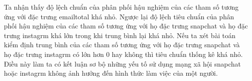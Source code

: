Ta nhận thấy độ lệch chuẩn của phân phối hậu nghiệm của các tham số tương ứng với đặc trưng emailtotal khá nhỏ.
Ngược lại độ lệch tiêu chuẩn của phân phối hậu nghiệm của các tham số tương ứng với họ đặc trưng snapchat và họ đặc trưng instagrm khá lớn trong khi trung bình lại khá nhỏ.
Nếu ta xét bài toán kiểm định trung bình của các tham số tương ứng với họ đặc trưng snapchat và họ đặc trưng instagrm có lớn hơn 0 hay không thì tiêu chuẩn thống kê khá nhỏ.
Điều này làm ta có kết luận sơ bộ những yếu tố sử dụng mạng xã hội snapchat hoặc instagrm không ảnh hưởng đến hình thức làm việc của một người.


